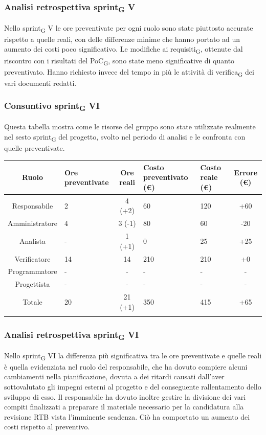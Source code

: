 \subsubsection{Analisi retrospettiva sprint\textsubscript{G} V}
Nello sprint\textsubscript{G} V le ore preventivate per ogni ruolo sono state piuttosto accurate rispetto a quelle reali, con delle differenze minime che hanno portato ad un aumento dei costi poco significativo. Le modifiche ai requisiti\textsubscript{G}, ottenute dal riscontro con i risultati del PoC\textsubscript{G}, sono state meno significative di quanto preventivato. Hanno richiesto invece del tempo in più le attività di verifica\textsubscript{G} dei vari documenti redatti.

\newpage
\subsubsection{Consuntivo sprint\textsubscript{G} VI}
Questa tabella mostra come le risorse del gruppo sono state utilizzate realmente nel sesto sprint\textsubscript{G} del progetto, svolto nel periodo di analisi e le confronta con quelle preventivate.

\setlength\extrarowheight{5pt}
\begin{tabularx}{\textwidth}{|c|XcXX|c|}
	\hline
	\rowcolor{white}
	\textbf{Ruolo} & \textbf{Ore preventivate} & \textbf{Ore reali} & \textbf{Costo preventivato (€)} & \textbf{Costo reale (€)} & \textbf{Errore (€)} \\
	\hline
	Responsabile &2&4 (+2)&60&120&+60\\
	Amministratore &4&3 (-1)&80&60&-20\\
	Analista &-&1 (+1)&0&25&+25\\
	Verificatore &14&14&210&210&+0\\
	Programmatore &-&-&-&-&-\\
	Progettista &-&-&-&-&- \\
	\hline
	Totale &20&21 (+1)&350&415&+65\\
	\hline
	\rowcolor{white}
	\caption{Consuntivo ore e costi per ruolo del sesto sprint\textsubscript{G}}
\end{tabularx}
\subsubsection{Analisi retrospettiva sprint\textsubscript{G} VI}
Nello sprint\textsubscript{G} VI la differenza più significativa tra le ore preventivate e quelle reali è quella evidenziata nel ruolo del responsabile, che ha dovuto compiere alcuni cambiamenti nella pianificazione, dovuta a dei ritardi causati dall'aver sottovalutato gli impegni esterni al progetto e del conseguente rallentamento dello sviluppo di esso. Il responsabile ha dovuto inoltre gestire la divisione dei vari compiti finalizzati a preparare il materiale necessario per la candidatura alla revisione RTB vista l'imminente scadenza. Ciò ha comportato un aumento dei costi rispetto al preventivo.

